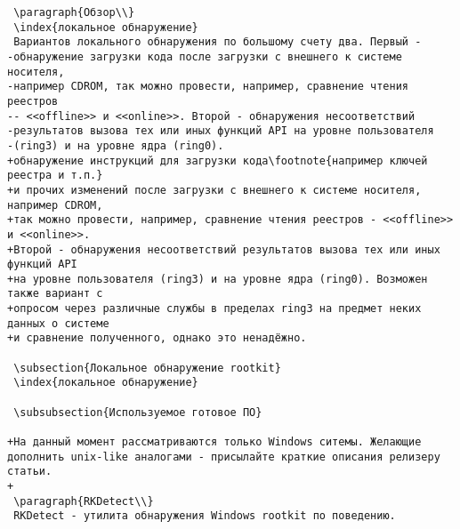 \begin{verbatim}
 \paragraph{Обзор\\}
 \index{локальное обнаружение}
 Вариантов локального обнаружения по большому счету два. Первый -
-обнаружение загрузки кода после загрузки с внешнего к системе носителя,
-например CDROM, так можно провести, например, сравнение чтения реестров
-- <<offline>> и <<online>>. Второй - обнаружения несоответствий
-результатов вызова тех или иных функций API на уровне пользователя
-(ring3) и на уровне ядра (ring0).
+обнаружение инструкций для загрузки кода\footnote{например ключей реестра и т.п.}
+и прочих изменений после загрузки с внешнего к системе носителя, например CDROM,
+так можно провести, например, сравнение чтения реестров - <<offline>> и <<online>>.
+Второй - обнаружения несоответствий результатов вызова тех или иных функций API
+на уровне пользователя (ring3) и на уровне ядра (ring0). Возможен также вариант с
+опросом через различные службы в пределах ring3 на предмет неких данных о системе
+и сравнение полученного, однако это ненадёжно.

 \subsection{Локальное обнаружение rootkit}
 \index{локальное обнаружение}

 \subsubsection{Используемое готовое ПО}

+На данный момент рассматриваются только Windows ситемы. Желающие дополнить unix-like аналогами - присылайте краткие описания релизеру статьи.
+
 \paragraph{RKDetect\\}
 RKDetect - утилита обнаружения Windows rootkit по поведению.


\end{verbatim}
